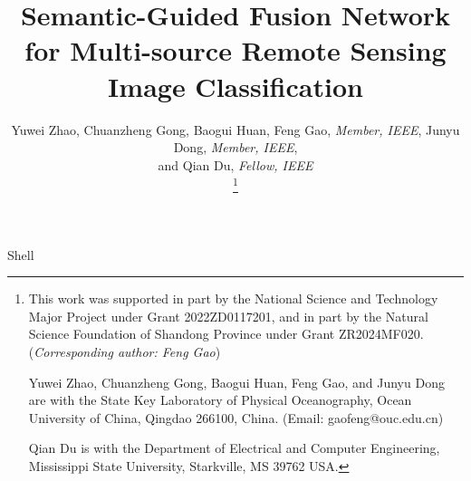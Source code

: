 \documentclass[journal]{IEEEtran}
\begin{document}
\title{Semantic-Guided Fusion Network for Multi-source Remote Sensing Image Classification}

\author{
  Yuwei Zhao, 
  Chuanzheng Gong,
  Baogui Huan,
  Feng Gao, \emph{Member, IEEE},
  Junyu Dong, \emph{Member, IEEE},  \\
  and Qian Du, \emph{Fellow, IEEE}

  \thanks{
    This work was supported in part by the National Science and Technology Major Project under Grant 2022ZD0117201, and in part by the Natural Science Foundation of Shandong Province under Grant ZR2024MF020. (\textit{Corresponding author: Feng Gao})

    Yuwei Zhao, Chuanzheng Gong, Baogui Huan, Feng Gao, and Junyu Dong are with the State Key Laboratory of Physical Oceanography, Ocean University of China, Qingdao 266100, China. (Email: gaofeng@ouc.edu.cn)

    Qian Du is with the Department of Electrical and Computer Engineering, Mississippi State University, Starkville, MS 39762 USA.
  }
}

%
{Shell}

\maketitle









\end{document}

